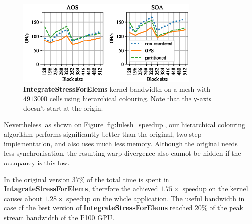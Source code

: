 \begin{figure}[Htbp]
  \centering
  \includegraphics[width=9cm]{fig/lulesh_bw-vs-bs_hier.eps}
  \caption{\textbf{IntegrateStressForElems} kernel bandwidth on a mesh with
  $4913000$ cells using hierarchical colouring. Note that the y-axis doesn't
  start at the origin.}
  \label{fig:lulesh_bw-vs-bs_hier}
\end{figure}

Nevertheless, as shown on Figure \ref{fig:lulesh_speedup}, our hierarchical
colouring algorithm performs significantly better than the original, two-step
implementation, and also uses much less memory. Although the original needs less
synchronisation, the resulting warp divergence also cannot be hidden if the
occupancy is this low.

In the original version $37\%$ of the total time is spent in
\textbf{IntagrateStressForElems}, therefore the achieved $1.75\times$ speedup on
the kernel causes about $1.28\times$ speedup on the whole application. The
useful bandwidth in case of the best version of \textbf{IntegrateStressForElems}
reached $20\%$ of the peak stream bandwidth of the P100 GPU.

